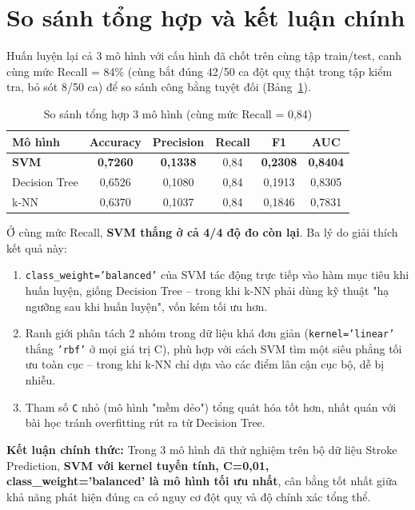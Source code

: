 \documentclass[12pt,a4paper]{report}
\begin{document}
\section{So sánh tổng hợp và kết luận chính}

Huấn luyện lại cả 3 mô hình với cấu hình đã chốt trên cùng tập train/test, canh cùng mức Recall = 84\% (cùng bắt đúng 42/50 ca đột quỵ thật trong tập kiểm tra, bỏ sót 8/50 ca) để so sánh công bằng tuyệt đối (Bảng~\ref{tab:sosanh}).

\begin{table}[H]
\centering
\caption{So sánh tổng hợp 3 mô hình (cùng mức Recall = 0,84)}
\label{tab:sosanh}
\begin{tabular}{lccccc}
\toprule
\textbf{Mô hình} & \textbf{Accuracy} & \textbf{Precision} & \textbf{Recall} & \textbf{F1} & \textbf{AUC} \\
\midrule
\textbf{SVM} & \textbf{0,7260} & \textbf{0,1338} & 0,84 & \textbf{0,2308} & \textbf{0,8404} \\
Decision Tree & 0,6526 & 0,1080 & 0,84 & 0,1913 & 0,8305 \\
k-NN & 0,6370 & 0,1037 & 0,84 & 0,1846 & 0,7831 \\
\bottomrule
\end{tabular}
\end{table}

Ở cùng mức Recall, \textbf{SVM thắng ở cả 4/4 độ đo còn lại}. Ba lý do giải thích kết quả này:
\begin{enumerate}
    \item \texttt{class\_weight='balanced'} của SVM tác động trực tiếp vào hàm mục tiêu khi huấn luyện, giống Decision Tree -- trong khi k-NN phải dùng kỹ thuật "hạ ngưỡng sau khi huấn luyện", vốn kém tối ưu hơn.
    \item Ranh giới phân tách 2 nhóm trong dữ liệu khá đơn giản (\texttt{kernel='linear'} thắng \texttt{'rbf'} ở mọi giá trị C), phù hợp với cách SVM tìm một siêu phẳng tối ưu toàn cục -- trong khi k-NN chỉ dựa vào các điểm lân cận cục bộ, dễ bị nhiễu.
    \item Tham số \texttt{C} nhỏ (mô hình "mềm dẻo") tổng quát hóa tốt hơn, nhất quán với bài học tránh overfitting rút ra từ Decision Tree.
\end{enumerate}

\textbf{Kết luận chính thức:} Trong 3 mô hình đã thử nghiệm trên bộ dữ liệu Stroke Prediction, \textbf{SVM với kernel tuyến tính, C=0,01, class\_weight='balanced' là mô hình tối ưu nhất}, cân bằng tốt nhất giữa khả năng phát hiện đúng ca có nguy cơ đột quỵ và độ chính xác tổng thể.
\end{document}
